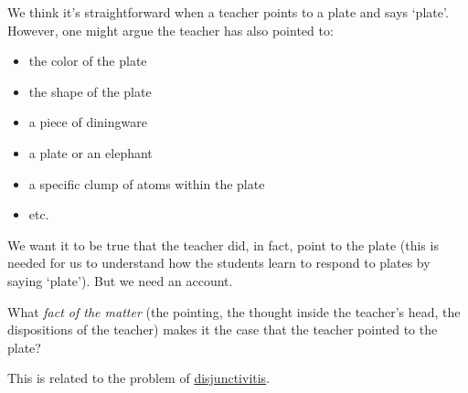 We think it's straightforward when a teacher points to a plate and says `plate'. However, one might argue the teacher has also pointed to:

\begin{itemize}
\item the color of the plate
\item the shape of the plate
\item a piece of diningware
\item a plate or an elephant
\item a specific clump of atoms within the plate
\item etc.
\end{itemize}

We want it to be true that the teacher did, in fact, point to the plate (this is needed for us to understand how the students learn to respond to plates by saying `plate'). But we need an account.

What \emph{fact of the matter} (the pointing, the thought inside the teacher's head, the dispositions of the teacher) makes it the case that the teacher pointed to the plate?

This is related to the problem of \href{doc/phil/Phil Problems/Disjunctivitis|Plate example}{disjunctivitis}.
